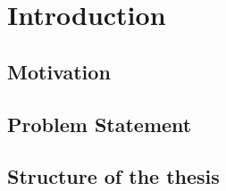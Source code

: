 
\chapter*{Introduction}
\label{sec:org2820556}

\section*{Motivation}
\label{sec:org66a9855}

\section*{Problem Statement}
\label{sec:org49c4d10}

\section*{Structure of the thesis}
\label{sec:org7a7d758}
